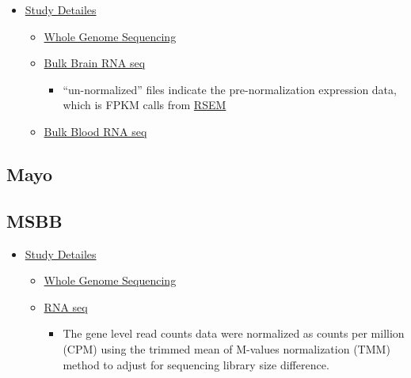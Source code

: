 \documentclass[]{book}
\providecommand{\tightlist}{%
  \setlength{\itemsep}{0pt}\setlength{\parskip}{0pt}}
\begin{document}
\begin{itemize}
\tightlist
\item
  \href{https://adknowledgeportal.synapse.org/Explore/Studies/DetailsPage?Study=syn3219045}{Study Detailes}

  \begin{itemize}
  \tightlist
  \item
    \href{https://www.synapse.org/\#!Synapse:syn3157325}{Whole Genome Sequencing}
  \item
    \href{https://www.synapse.org/\#!Synapse:syn3388564}{Bulk Brain RNA seq}

    \begin{itemize}
    \tightlist
    \item
      ``un-normalized'' files indicate the pre-normalization expression data, which is FPKM calls from \href{https://bmcbioinformatics.biomedcentral.com/articles/10.1186/1471-2105-12-323}{RSEM}
    \end{itemize}
  \item
    \href{https://www.synapse.org/\#!Synapse:syn22024496}{Bulk Blood RNA seq}
  \end{itemize}
\end{itemize}

\hypertarget{mayo}{%
\subsection{Mayo}\label{mayo}}

\hypertarget{msbb}{%
\subsection{MSBB}\label{msbb}}

\begin{itemize}
\tightlist
\item
  \href{https://adknowledgeportal.synapse.org/Explore/Studies/DetailsPage?Study=syn3159438}{Study Detailes}

  \begin{itemize}
  \tightlist
  \item
    \href{https://www.synapse.org/\#!Synapse:syn10901600}{Whole Genome Sequencing}
  \item
    \href{https://www.synapse.org/\#!Synapse:syn20801188}{RNA seq}

    \begin{itemize}
    \tightlist
    \item
      The gene level read counts data were normalized as counts per million (CPM) using the trimmed mean of M-values normalization (TMM) method to adjust for sequencing library size difference.
    \end{itemize}
  \end{itemize}
\end{itemize}
\end{document}
